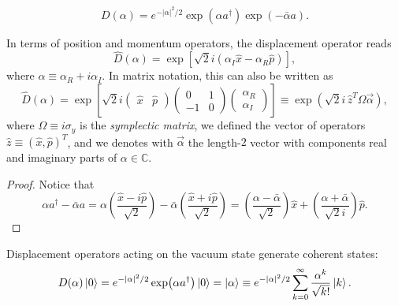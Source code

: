 \documentclass[12pt]{report}
\newcommand{\CC}{\mathbb{C}}
\begin{document}
\begin{prop}
	\begin{equation}
		D(\alpha)
		= e^{-\lvert\alpha\rvert^2/2}
			\exp(\alpha a^\dagger)\exp(-\bar\alpha a).
	\end{equation}
\end{prop}

\begin{prop}
	In terms of position and momentum operators, the displacement operator reads
	\begin{equation}
		\hat D(\alpha)
		= \exp[\sqrt2 i(\alpha_I \hat x - \alpha_R \hat p)],
	\end{equation}
	where $\alpha\equiv \alpha_R+i\alpha_I$.
	In matrix notation, this can also be written as
	\begin{equation}
		\hat D(\alpha)
		= \exp\left[\sqrt2 i \begin{pmatrix}
			\hat x & \hat p
		\end{pmatrix}
		\begin{pmatrix}
			0 & 1 \\ -1 & 0
		\end{pmatrix}
		\begin{pmatrix}
			\alpha_R \\ \alpha_I
		\end{pmatrix}\right]
		\equiv \exp(\sqrt2 i\, \hat z^T \Omega \vec\alpha),
	\end{equation}
	where $\Omega\equiv i\sigma_y$ is the \emph{symplectic matrix}, we defined the vector of operators $\hat z\equiv (\hat x,\hat p)^T$, and we denotes with $\vec \alpha$ the length-$2$ vector with components real and imaginary parts of $\alpha\in\CC$.
\end{prop}
\begin{proof}
	Notice that
	\begin{equation}
		\alpha a^\dagger - \bar\alpha a
		= \alpha \left(\frac{\hat x-i\hat p}{\sqrt2}\right)
		- \bar\alpha\left(\frac{\hat x + i\hat p}{\sqrt2}\right)
		= \left(\frac{\alpha-\bar\alpha}{\sqrt2}\right) \hat x
		+ \left(\frac{\alpha+\bar\alpha}{\sqrt2 i}\right) \hat p.
	\end{equation}
\end{proof}

\begin{prop}
	Displacement operators acting on the vacuum state generate coherent states:
	\begin{equation}
		D(\alpha)\ket0 = e^{-|\alpha|^2/2}\exp(\alpha a^\dagger)\ket0
		= \ket\alpha
		\equiv e^{-|\alpha|^2/2} \sum_{k=0}^\infty
			\frac{\alpha^k}{\sqrt{k!}} \ket k.
	\end{equation}
\end{prop}
\end{document}
